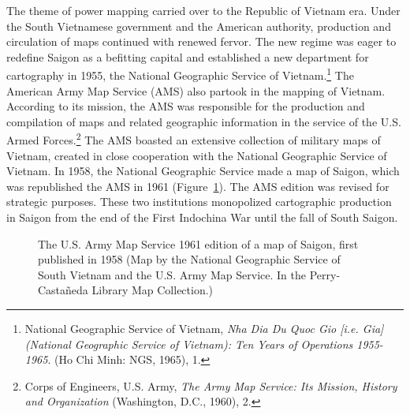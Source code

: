 The theme of power mapping carried over to the Republic of Vietnam era. Under the South Vietnamese government and the American authority, production and circulation of maps continued with renewed fervor. The new regime was eager to redefine Saigon as a befitting capital and established a new department for cartography in 1955, the National Geographic Service of Vietnam.\footnote{National Geographic Service of Vietnam, \textit {Nha Dia Du Quoc Gio [i.e. Gia] (National Geographic Service of Vietnam): Ten Years of Operations 1955-1965}. (Ho Chi Minh: NGS, 1965), 1.} The American Army Map Service (AMS) also partook in the mapping of Vietnam. According to its mission, the AMS was responsible for the production and compilation of maps and related geographic information in the service of the U.S. Armed Forces.\footnote{Corps of Engineers, U.S. Army, \textit{The Army Map Service: Its Mission, History and Organization} (Washington, D.C., 1960), 2.} The AMS boasted an extensive collection of military maps of Vietnam, created in close cooperation with the National Geographic Service of Vietnam. In 1958, the National Geographic Service made a map of Saigon, which was republished the AMS in 1961 (Figure~\ref{map_1961}). The AMS edition was revised for strategic purposes. These two institutions monopolized cartographic production in Saigon from the end of the First Indochina War until the fall of South Saigon.
\en

\begin{figure}[!ht]\centering
\subfigure
{}
\qquad
\hspace{-.44 in}
\subfigure
{}
\vspace{-.3 in}
\caption[U.S. Army Map Service's 1961 map of Saigon]{The U.S. Army Map Service 1961 edition of a map of Saigon, first published in 1958 (Map by the National Geographic Service of South Vietnam and the U.S. Army Map Service. In the Perry-Castañeda Library Map Collection.\footnotemark)}\label{map_1961}
\end{figure}

\begin{figure}[!ht]
\end{figure}


